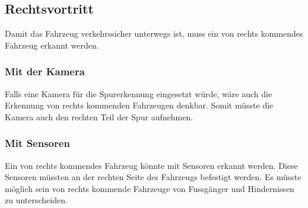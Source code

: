 \subsection{Rechtsvortritt}
Damit das Fahrzeug verkehrssicher unterwegs ist, muss ein von rechts kommendes Fahrzeug erkannt werden.
\subsubsection{Mit der Kamera}
Falls eine Kamera für die Spurerkennung eingesetzt würde, wäre auch die Erkennung von rechts kommenden Fahrzeugen denkbar. Somit müsste die Kamera auch den rechten Teil der Spur aufnehmen.
\subsubsection{Mit Sensoren}
Ein von rechts kommendes Fahrzeug könnte mit Sensoren erkannt werden. Diese Sensoren müssten an der rechten Seite des Fahrzeugs befestigt werden. Es müsste möglich sein von rechts kommende Fahrzeuge von Fussgänger und Hindernissen zu unterscheiden.